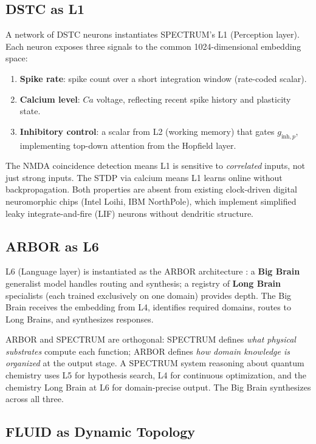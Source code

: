 \documentclass[12pt]{article}
\begin{document}
\subsection{DSTC as L1}

A network of DSTC neurons instantiates SPECTRUM's L1 (Perception layer). Each neuron exposes three signals to the common 1024-dimensional embedding space:

\begin{enumerate}
    \item \textbf{Spike rate}: spike count over a short integration window (rate-coded scalar).
    \item \textbf{Calcium level}: $Ca$ voltage, reflecting recent spike history and plasticity state.
    \item \textbf{Inhibitory control}: a scalar from L2 (working memory) that gates $g_{\text{inh},p}$, implementing top-down attention from the Hopfield layer.
\end{enumerate}

\noindent The NMDA coincidence detection means L1 is sensitive to \textit{correlated} inputs, not just strong inputs. The STDP via calcium means L1 learns online without backpropagation. Both properties are absent from existing clock-driven digital neuromorphic chips (Intel Loihi, IBM NorthPole), which implement simplified leaky integrate-and-fire (LIF) neurons without dendritic structure.

\subsection{ARBOR as L6}

L6 (Language layer) is instantiated as the ARBOR architecture \cite{lin2026arbor}: a \textbf{Big Brain} generalist model handles routing and synthesis; a registry of \textbf{Long Brain} specialists (each trained exclusively on one domain) provides depth. The Big Brain receives the embedding from L4, identifies required domains, routes to Long Brains, and synthesizes responses.

ARBOR and SPECTRUM are orthogonal: SPECTRUM defines \textit{what physical substrates} compute each function; ARBOR defines \textit{how domain knowledge is organized} at the output stage. A SPECTRUM system reasoning about quantum chemistry uses L5 for hypothesis search, L4 for continuous optimization, and the chemistry Long Brain at L6 for domain-precise output. The Big Brain synthesizes across all three.

\subsection{FLUID as Dynamic Topology}
\end{document}
